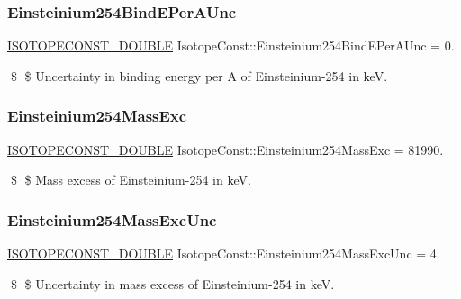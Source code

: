\subsubsection{\texorpdfstring{Einsteinium254\+Bind\+E\+Per\+A\+Unc}{Einsteinium254BindEPerAUnc}}
{\footnotesize\ttfamily \mbox{\hyperlink{group___isotope_const-_macros_ga8f45a7272ce02c0b4c65c44636ed719a}{I\+S\+O\+T\+O\+P\+E\+C\+O\+N\+S\+T\+\_\+\+D\+O\+U\+B\+LE}} Isotope\+Const\+::\+Einsteinium254\+Bind\+E\+Per\+A\+Unc = 0.}

\$ \$ Uncertainty in binding energy per A of Einsteinium-\/254 in keV. \mbox{\label{group___isotope_const-_einsteinium-_es254_gad540178738c7cd3996c981184a52374f}} 
\subsubsection{\texorpdfstring{Einsteinium254\+Mass\+Exc}{Einsteinium254MassExc}}
{\footnotesize\ttfamily \mbox{\hyperlink{group___isotope_const-_macros_ga8f45a7272ce02c0b4c65c44636ed719a}{I\+S\+O\+T\+O\+P\+E\+C\+O\+N\+S\+T\+\_\+\+D\+O\+U\+B\+LE}} Isotope\+Const\+::\+Einsteinium254\+Mass\+Exc = 81990.}

\$ \$ Mass excess of Einsteinium-\/254 in keV. \mbox{\label{group___isotope_const-_einsteinium-_es254_gae9f2a25990f323ec7c4a878410f12233}} 
\subsubsection{\texorpdfstring{Einsteinium254\+Mass\+Exc\+Unc}{Einsteinium254MassExcUnc}}
{\footnotesize\ttfamily \mbox{\hyperlink{group___isotope_const-_macros_ga8f45a7272ce02c0b4c65c44636ed719a}{I\+S\+O\+T\+O\+P\+E\+C\+O\+N\+S\+T\+\_\+\+D\+O\+U\+B\+LE}} Isotope\+Const\+::\+Einsteinium254\+Mass\+Exc\+Unc = 4.}

\$ \$ Uncertainty in mass excess of Einsteinium-\/254 in keV. \mbox{\label{group___isotope_const-_einsteinium-_es254_gac7ebdec7e47bf6f53f046d998592438f}} 
